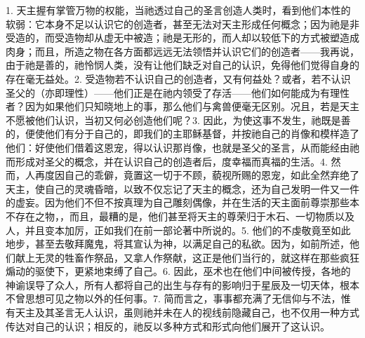 1. 天主握有掌管万物的权能，当祂透过自己的圣言创造人类时，看到他们本性的软弱：它本身不足以认识它的创造者，甚至无法对天主形成任何概念；因为祂是非受造的，而受造物却从虚无中被造；祂是无形的，而人却以较低下的方式被塑造成肉身；而且，所造之物在各方面都远远无法领悟并认识它们的创造者——我再说，由于祂是善的，祂怜悯人类，没有让他们缺乏对自己的认识，免得他们觉得自身的存在毫无益处。\newline{}2. 受造物若不认识自己的创造者，又有何益处？或者，若不认识圣父的（亦即理性）——他们正是在祂内领受了存活——他们如何能成为有理性者？因为如果他们只知晓地上的事，那么他们与禽兽便毫无区别。况且，若是天主不愿被他们认识，当初又何必创造他们呢？\newline{}3. 因此，为使这事不发生，祂既是善的，便使他们有分于自己的，即我们的主耶稣基督，并按祂自己的肖像和模样造了他们：好使他们借着这恩宠，得以认识那肖像，也就是圣父的圣言，从而能经由祂而形成对圣父的概念，并在认识自己的创造者后，度幸福而真福的生活。\newline{}4. 然而，人再度因自己的乖僻，竟置这一切于不顾，藐视所赐的恩宠，如此全然弃绝了天主，使自己的灵魂昏暗，以致不仅忘记了天主的概念，还为自己发明一件又一件的虚妄。因为他们不但不按真理为自己雕刻偶像，并在生活的天主面前尊崇那些本不存在之物，，而且，最糟的是，他们甚至将天主的尊荣归于木石、一切物质以及人，并且变本加厉，正如我们在前一部论著中所说的。\newline{}5. 他们的不虔敬竟至如此地步，甚至去敬拜魔鬼，将其宣认为神，以满足自己的私欲。因为，如前所述，他们献上无灵的牲畜作祭品，又拿人作祭献，这正是他们当行的，就这样在那些疯狂煽动的驱使下，更紧地束缚了自己。\newline{}6. 因此，巫术也在他们中间被传授，各地的神谕误导了众人，所有人都将自己的出生与存有的影响归于星辰及一切天体，根本不曾思想可见之物以外的任何事。\newline{}7. 简而言之，事事都充满了无信仰与不法，惟有天主及其圣言无人认识，虽则祂并未在人的视线前隐藏自己，也不仅用一种方式传达对自己的认识；相反的，祂反以多种方式和形式向他们展开了这认识。\par


\section{}

